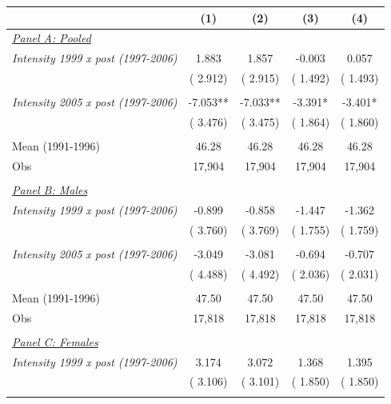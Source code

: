 \begin{tabular}{lcccc} \hline \hline
& \multicolumn{1}{c}{(1)} & \multicolumn{1}{c}{(2)} & \multicolumn{1}{c}{(3)} & \multicolumn{1}{c}{(4)} \\ \toprule
\underline{\textit{Panel A: Pooled}}  \\ 
\textit{Intensity 1999 x post (1997-2006)} &        1.883 &        1.857 &       -0.003 &        0.057 \\ 
 & (       2.912) & (       2.915) & (       1.492) & (       1.493) \\ 
  & & & & \\ 
\textit{Intensity 2005 x post (1997-2006)} &       -7.053** &       -7.033** &       -3.391* &       -3.401* \\ 
 & (       3.476) & (       3.475) & (       1.864) & (       1.860) \\ 
  & & & & \\ 
Mean (1991-1996) &        46.28 &        46.28 &        46.28 &        46.28 \\ 
Obs &       17,904 &       17,904 &       17,904 &       17,904 \\ 
  & & & & \\ 
\underline{\textit{Panel B: Males}}  \\ 
\textit{Intensity 1999 x post (1997-2006)} &       -0.899 &       -0.858 &       -1.447 &       -1.362 \\ 
 & (       3.760) & (       3.769) & (       1.755) & (       1.759) \\ 
  & & & & \\ 
\textit{Intensity 2005 x post (1997-2006)} &       -3.049 &       -3.081 &       -0.694 &       -0.707 \\ 
 & (       4.488) & (       4.492) & (       2.036) & (       2.031) \\ 
  & & & & \\ 
Mean (1991-1996) &        47.50 &        47.50 &        47.50 &        47.50 \\ 
Obs &       17,818 &       17,818 &       17,818 &       17,818 \\ 
  & & & & \\ 
\underline{\textit{Panel C: Females}}  \\ 
\textit{Intensity 1999 x post (1997-2006)} &        3.174 &        3.072 &        1.368 &        1.395 \\ 
 & (       3.106) & (       3.101) & (       1.850) & (       1.850) \\ 
  & & & & \\ 

\end{tabular}
